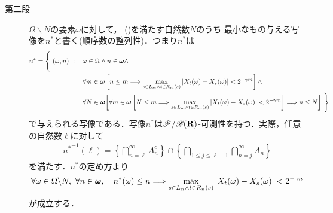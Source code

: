 \begin{prf}
\begin{description}
			\item[第二段]
				$\Omega \backslash N$の要素$\omega$に対して，
				()を満たす自然数$N$のうち
				最小なもの与える写像を$n^*$と書く(順序数の整列性)．つまり$n^*$は
				\begin{align}
					n^* = \Biggl\{\ (\omega,n)\ \, : \quad &\omega \in \Omega \wedge n \in {\boldsymbol \omega} \wedge \Biggr.\\
					&\forall m \in {\boldsymbol \omega} \left[n \leq m \Longrightarrow \operatorname*{max}_{s \in L_m \wedge t \in R_m(s)}
						|X_t(\omega) - X_s(\omega)| < 2^{-\gamma m}\right] \wedge \\
					&\forall N \in {\boldsymbol \omega}
					\Biggl. \left[\forall m \in {\boldsymbol \omega} \left[N \leq m \Longrightarrow \operatorname*{max}_{s \in L_m \wedge t \in R_m(s)}
						|X_t(\omega) - X_s(\omega)| < 2^{-\gamma m}\right] \Longrightarrow n \leq N\right]\ \Biggr\}
				\end{align}
				で与えられる写像である．写像$n^*$は$\mathscr{F}/\mathscr{B}(\mathbf{R})$-可測性を持つ．実際，任意の自然数$\ell$に対して
				\begin{align}
					{n^*}^{-1}(\ell) = \left\{ \bigcap_{n = \ell}^\infty A_n^c \right\} \cap \left\{ \bigcap_{1 \leq j \leq \ell-1} \bigcap_{n = j}^\infty A_n \right\}
				\end{align}
				を満たす．$n^*$の定め方より
				\begin{align}
					\forall \omega \in \Omega \backslash N,\
					\forall n \in {\boldsymbol \omega},\quad 
					n^*(\omega) \leq n \Longrightarrow \operatorname*{max}_{s \in L_n \wedge t \in R_n(s)}|X_t(\omega) - X_s(\omega)| < 2^{-\gamma n}
					\label{eq:chapter_2_theorem_2_8_2}
				\end{align}
				が成立する．
				

\end{description}
\end{prf}
